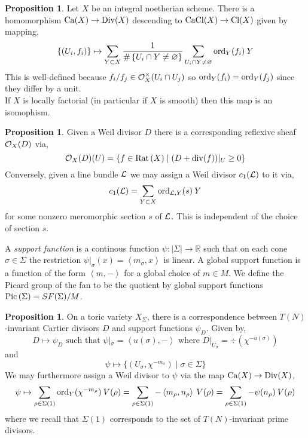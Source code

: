 \documentclass[12pt]{extarticle}
\newcommand{\R}{\mathbb{R}}
\theoremstyle{definition}
\newtheorem{proposition}[theorem]{Proposition}
\newenvironment{definition}[1][Definition:]{\begin{trivlist}
\item[\hskip \labelsep {\bfseries #1}]}{\end{trivlist}}
\newcommand{\inner}[2]{\left< #1, #2 \right>}
\begin{document}
\begin{proposition}
Let $X$ be an integral noetherian scheme. There is a homomorphism $\mathrm{Ca}{(X)} \to \mathrm{Div}{(X)}$ descending to $\mathrm{CaCl}{(X)} \to \mathrm{Cl}{(X)}$ given by mapping,
\[ \{ (U_i, f_i) \} \mapsto \sum_{Y \subset X} \frac{1}{\# \left\{ U_i \cap Y \neq \varnothing \right\} }\sum_{U_i \cap Y \neq \varnothing} \mathrm{ord}_{Y}(f_i) \: Y \]
This is well-defined because $f_i / f_j \in \mathcal{O}_{X}^\times(U_i \cap U_j)$ so $\mathrm{ord}_{Y}(f_i) = \mathrm{ord}_{Y}(f_j)$ since they differ by a unit.
\bigskip\\
If $X$ is locally factorial (in particular if $X$ is smooth) then this map is an isomophism. 
\end{proposition}

\begin{proposition}
Given a Weil divisor $D$ there is a corresponding reflexive sheaf $\mathcal{O}_{X}(D)$ via,
\[ \mathcal{O}_{X}(D)(U) = \{ f \in \mathrm{Rat} \left( X \right) \mid (D + \mathrm{div}{(f)})|_U \ge 0 \} \]
Conversely, given a line bundle $\mathcal{L}$ we may assign a Weil divisor $c_1(\mathcal{L})$ to it via,
\[ c_1(\mathcal{L}) = \sum_{Y \subset X} \mathrm{ord}_{\mathcal{L}, Y}(s) \: Y \]
for some nonzero meromorphic section $s$ of $\mathcal{L}$. This is independent of the choice of section $s$. 
\end{proposition}

\begin{definition}
A \textit{support function} is a continous function $\psi : |\Sigma| \to \R$ such that on each cone $\sigma \in \Sigma$ the restriction $\psi |_\sigma(x) = \inner{m_\sigma}{x}$ is linear. A global support function is a function of the form $\inner{m}{-}$ for  a global choice of $m \in M$. We define the Picard group of the fan to be the quotient by global support functions $\mathrm{Pic}\left( \Sigma \right) = SF(\Sigma) / M$. 
\end{definition}

\begin{proposition}
On a toric variety $X_\Sigma$, there is a correspondence between $T(N)$-invariant Cartier divisors $D$ and support functions $\psi_D$. Given by,
\[ D \mapsto \psi_D \text{ such that } \psi|_\sigma = \inner{u(\sigma)}{-} \text{ where } D |_{U_\sigma} =  \div{(\chi^{-u(\sigma)})} \]
and
\[ \psi \mapsto \{ (U_\sigma, \chi^{-m_\sigma}) \mid \sigma \in \Sigma \} \] 
We may furthermore assign a Weil divisor to $\psi$ via the map $\mathrm{Ca}{(X)} \to \mathrm{Div}{(X)}$,
\[ \psi \mapsto \sum_{\rho \in \Sigma(1)} \ord_{Y}(\chi^{-m_\rho}) \: V(\rho) = \sum_{\rho \in \Sigma(1)} -\inner{m_\rho}{n_\rho} \: V(\rho) = \sum_{\rho \in \Sigma(1)} -\psi(n_\rho) \: V(\rho) \] 
where we recall that $\Sigma(1)$ corresponds to the set of $T(N)$-invariant prime divisors.
\end{proposition}
\end{document}
